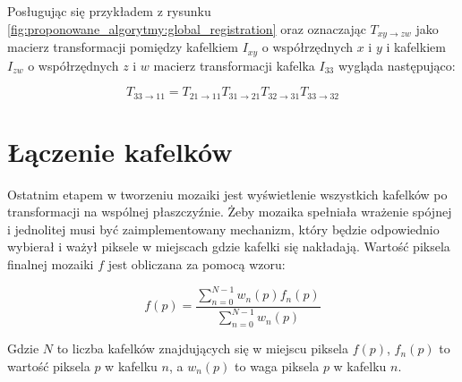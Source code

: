 Posługując się przykładem z rysunku \ref{fig:proponowane_algorytmy:global_registration} oraz oznaczając $T_{xy\rightarrow zw}$ jako macierz transformacji pomiędzy kafelkiem $I_{xy}$ o współrzędnych $x$ i $y$ i kafelkiem $I_{zw}$ o współrzędnych $z$ i $w$ macierz transformacji kafelka $I_{33}$ wygląda następująco:

\begin{equation}
T_{33\rightarrow 11} = T_{21\rightarrow 11}T_{31\rightarrow 21}T_{32\rightarrow 31}T_{33\rightarrow 32}
\end{equation}

\section{Łączenie kafelków}
\label{sec:proponowane_algorytmy:laczenie_kafelkow}

Ostatnim etapem w tworzeniu mozaiki jest wyświetlenie wszystkich kafelków po transformacji na wspólnej płaszczyźnie. Żeby mozaika spełniała wrażenie spójnej i jednolitej musi być zaimplementowany mechanizm, który będzie odpowiednio wybierał i ważył piksele w miejscach gdzie kafelki się nakładają. Wartość piksela finalnej mozaiki $f$ jest obliczana za pomocą wzoru:

\begin{equation}
f(p) = \frac{\sum_{n = 0}^{N - 1} w_n(p)f_n(p)}{\sum_{n = 0}^{N - 1} w_n(p)}
\end{equation}

Gdzie $N$ to liczba kafelków znajdujących się w miejscu piksela $f(p)$, $f_n(p)$ to wartość piksela $p$ w kafelku $n$, a $w_n(p)$ to waga piksela $p$ w kafelku $n$.































